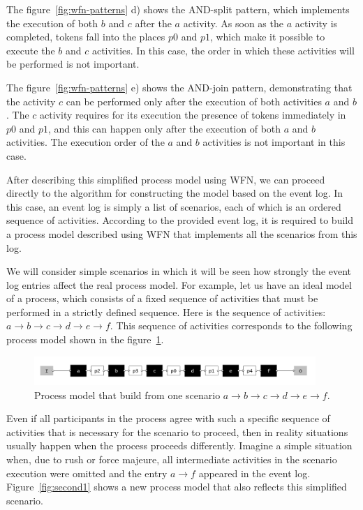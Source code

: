 \documentclass[
11pt,%
tightenlines,%
twoside,%
onecolumn,%
nofloats,%
nobibnotes,%
nofootinbib,%
superscriptaddress,%
noshowpacs,%
centertags]%
{revtex4}
\begin{document}
The figure~\ref{fig:wfn-patterns} d) shows the AND-split pattern, which implements the execution of both $b$ and $c$ after the $a$ activity.
As soon as the $a$ activity is completed, tokens fall into the places $p0$ and $p1$, which make it possible to execute the $b$ and $c$ activities.
In this case, the order in which these activities will be performed is not important.

The figure~\ref{fig:wfn-patterns} e) shows the AND-join pattern, demonstrating that the activity $c$ can be performed only after the execution of both activities $a$ and $b$.
The $c$ activity requires for its execution the presence of tokens immediately in $p0$ and $p1$, and this can happen only after the execution of both $a$ and $b$ activities.
The execution order of the $a$ and $b$ activities is not important in this case.

After describing this simplified process model using WFN, we can proceed directly to the algorithm for constructing the model based on the event log.
In this case, an event log is simply a list of scenarios, each of which is an ordered sequence of activities.
According to the provided event log, it is required to build a process model described using WFN that implements all the scenarios from this log.

We will consider simple scenarios in which it will be seen how strongly the event log entries affect the real process model.
For example, let us have an ideal model of a process, which consists of a fixed sequence of activities that must be performed in a strictly defined sequence.
Here is the sequence of activities: $a \rightarrow b \rightarrow c \rightarrow d \rightarrow e \rightarrow f$.
This sequence of activities corresponds to the following process model shown in the figure~\ref{fig:origin1}.

\begin{figure}[h]
\setcaptionmargin{5mm}
\includegraphics[width=0.95\textwidth]{pics/origin1.png}
\caption{Process model that build from one scenario $a \rightarrow b \rightarrow c \rightarrow d \rightarrow e \rightarrow f$.}
\label{fig:origin1}
\end{figure}

Even if all participants in the process agree with such a specific sequence of activities that is necessary for the scenario to proceed, then in reality situations usually happen when the process proceeds differently.
Imagine a simple situation when, due to rush or force majeure, all intermediate activities in the scenario execution were omitted and the entry $a \rightarrow f$ appeared in the event log.
Figure~\ref{fig:second1} shows a new process model that also reflects this simplified scenario.
\end{document}
